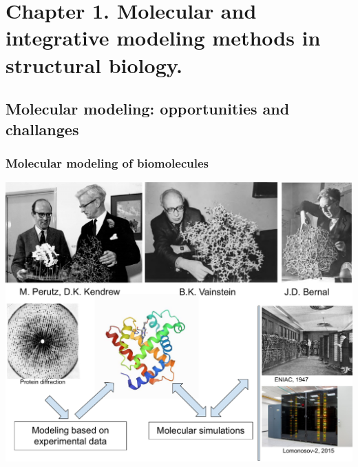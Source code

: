 
\section[Chapter 1]{Chapter 1. Molecular and integrative modeling methods in structural biology.}
\subsection{Molecular modeling: opportunities and challanges}

\begin{frame}%
\frametitle{Molecular modeling of biomolecules}
\centering
\includegraphics[height=0.85\textheight]{Presentation/images/s1_eng} %

\end{frame}
